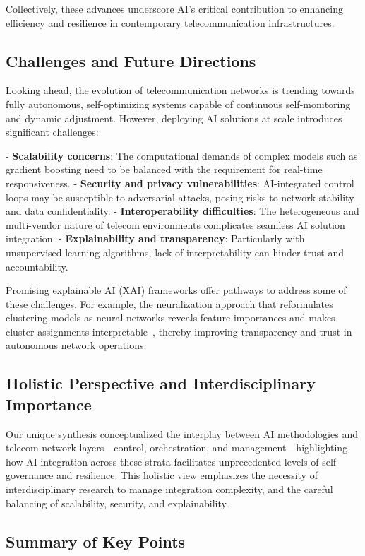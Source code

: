 \documentclass[sigconf]{acmart}
\begin{document}
Collectively, these advances underscore AI’s critical contribution to enhancing efficiency and resilience in contemporary telecommunication infrastructures.

\subsection{Challenges and Future Directions}

Looking ahead, the evolution of telecommunication networks is trending towards fully autonomous, self-optimizing systems capable of continuous self-monitoring and dynamic adjustment. However, deploying AI solutions at scale introduces significant challenges:

- \textbf{Scalability concerns}: The computational demands of complex models such as gradient boosting need to be balanced with the requirement for real-time responsiveness.
- \textbf{Security and privacy vulnerabilities}: AI-integrated control loops may be susceptible to adversarial attacks, posing risks to network stability and data confidentiality.
- \textbf{Interoperability difficulties}: The heterogeneous and multi-vendor nature of telecom environments complicates seamless AI solution integration.
- \textbf{Explainability and transparency}: Particularly with unsupervised learning algorithms, lack of interpretability can hinder trust and accountability.

Promising explainable AI (XAI) frameworks offer pathways to address some of these challenges. For example, the neuralization approach that reformulates clustering models as neural networks reveals feature importances and makes cluster assignments interpretable~\cite{ref45}, thereby improving transparency and trust in autonomous network operations.

\subsection{Holistic Perspective and Interdisciplinary Importance}

Our unique synthesis conceptualized the interplay between AI methodologies and telecom network layers—control, orchestration, and management—highlighting how AI integration across these strata facilitates unprecedented levels of self-governance and resilience. This holistic view emphasizes the necessity of interdisciplinary research to manage integration complexity, and the careful balancing of scalability, security, and explainability.

\subsection{Summary of Key Points}
\end{document}
